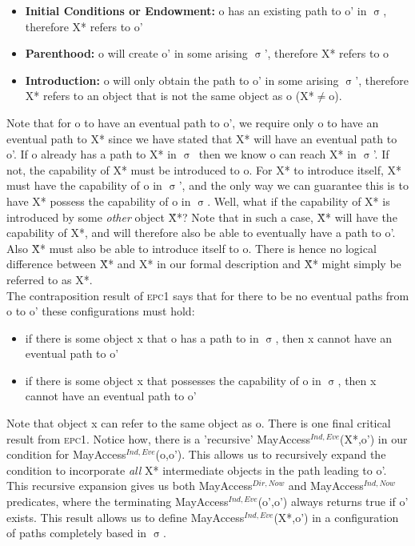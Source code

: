 \documentclass[a4paper,11pt, twoside,twocolumn]{article}
\newcommand{\loneq} {$\neq$}
\newcommand{\losigma}{$\upsigma$}
\begin{document}
\begin{itemize}
\item \textbf{Initial Conditions or Endowment:} o has an existing path to o' in \losigma, therefore X* refers to o'
\item \textbf{Parenthood:} o will create o' in some arising \losigma', therefore X* refers to o
\item \textbf{Introduction:} o will only obtain the path to o' in some arising \losigma', therefore X* refers to an object that is not the same object as o (X*\loneq o). 
\end{itemize}

Note that for o to have an eventual path to o', we require only o to have an eventual path to X* since we have stated that X* will have an eventual path to o'. If o already has a path to X* in \losigma\ then we know o can reach X* in \losigma'. If not, the capability of X* must be introduced to o. For X* to introduce itself, X* must have the capability of o in \losigma', and the only way we can guarantee this is to have X* possess the capability of o in \losigma. Well, what if the capability of X* is introduced by some \textit{other} object \~X*? Note that in such a case, \~X* will have the capability of X*, and will therefore also be able to eventually have a path to o'. Also \~X* must also be able to introduce itself to o. There is hence no logical difference between \~X* and X* in our formal description and \~X* might simply be referred to as X*.\\

The contraposition result of \textsc{epc1} says that for there to be no eventual paths from o to o' these configurations must hold:
\begin{itemize}\setlength\itemsep{0.5em}
\item if there is some object x that o has a path to in \losigma, then x cannot have an eventual path to o'
\item if there is some object x that possesses the capability of o in \losigma, then x cannot have an eventual path to o'
\end{itemize}
Note that object x can refer to the same object as o.
There is one final critical result from \textsc{epc1}.
Notice how, there is a 'recursive' MayAccess$^{Ind,Eve}$(X*,o') in our condition for MayAccess$^{Ind,Eve}$(o,o').
This allows us to recursively expand the condition to incorporate \textit{all} X* intermediate objects in the path leading to o'. This recursive expansion gives us both MayAccess$^{Dir,Now}$ and MayAccess$^{Ind,Now}$ predicates, where the terminating MayAccess$^{Ind,Eve}$(o',o') always returns true if o' exists. This result allows us to define MayAccess$^{Ind,Eve}$(X*,o') in a configuration of paths completely based in \losigma.\\
\end{document}
